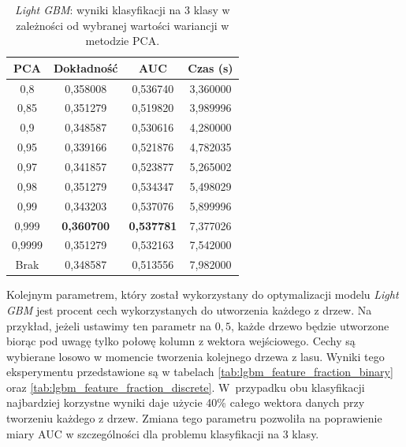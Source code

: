 \documentclass[a4paper, twoside, 11pt, openright]{article}
\begin{document}
\begin{table}[H]
    \centering
    \begin{tabular}{|c|c|c|c|}
    \hline
        \textbf{PCA} & \textbf{Dokładność} & \textbf{AUC} & \textbf{Czas (s)} \\ \hline
0,8                &  0,358008 &  0,536740 &    3,360000 \\ \hline
0,85               &  0,351279 &  0,519820 &    3,989996 \\ \hline
0,9                &  0,348587 &  0,530616 &    4,280000 \\ \hline
0,95               &  0,339166 &  0,521876 &    4,782035 \\ \hline
0,97               &  0,341857 &  0,523877 &    5,265002 \\ \hline
0,98               &  0,351279 &  0,534347 &    5,498029 \\ \hline
0,99               &  0,343203 &  0,537076 &    5,899996 \\ \hline
0,999			   &  \textbf{0,360700} &   \textbf{0,537781} &    7,377026 \\ \hline
0,9999             &  0,351279 &  0,532163 &    7,542000 \\ \hline
Brak                &  0,348587 &  0,513556 &    7,982000 \\ \hline
    \end{tabular}
    \caption{\textit{Light GBM}: wyniki klasyfikacji na 3 klasy w zależności od wybranej wartości wariancji w metodzie PCA.}
    \label{tab:lgbm_pca_discrete}
\end{table}

Kolejnym parametrem, który został wykorzystany do optymalizacji modelu \textit{Light GBM} jest procent cech wykorzystanych do utworzenia każdego z drzew. Na przykład, jeżeli ustawimy ten parametr na $0,5$, każde drzewo będzie utworzone biorąc pod uwagę tylko połowę kolumn z wektora wejściowego. Cechy są wybierane losowo w momencie tworzenia kolejnego drzewa z lasu. Wyniki tego eksperymentu przedstawione są w tabelach \ref{tab:lgbm_feature_fraction_binary} oraz \ref{tab:lgbm_feature_fraction_discrete}. W~przypadku obu klasyfikacji najbardziej korzystne wyniki daje użycie 40\% całego wektora danych przy tworzeniu każdego z drzew. Zmiana tego parametru pozwoliła na poprawienie miary AUC w szczególności dla problemu klasyfikacji na 3 klasy.
\end{document}
